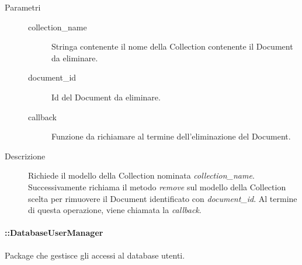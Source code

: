 \begin{description}
\begin{mldescription}
	 \hfill 
		\begin{description}
			\item[Parametri] \hfill
				\begin{description}
					\item[collection\_name] \hfill
					Stringa contenente il nome della Collection contenente il Document da eliminare.
					\item[document\_id] \hfill
					Id del Document da eliminare.
					\item[callback] \hfill
					Funzione da richiamare al termine dell'eliminazione del Document.
				\end{description}
			\item[Descrizione] \hfill
			Richiede il modello della Collection nominata \textit{collection\_name}. Successivamente richiama
			il metodo \textit{remove} sul modello della Collection scelta per rimuovere il Document identificato 
			con \textit{document\_id}. Al termine di questa 
			operazione, viene chiamata la \textit{callback}.
		\end{description}
		
\end{mldescription}

\end{description}

\paragraph{::DatabaseUserManager}
Package che gestisce gli accessi al database utenti.

